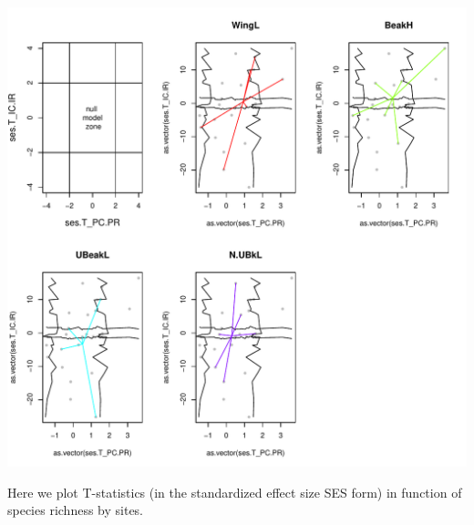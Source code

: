 \documentclass[12pt]{article}\usepackage[]{graphicx}\usepackage[]{color}
\makeatletter
\def\maxwidth{ %
  \ifdim\Gin@nat@width>\linewidth
    \linewidth
  \else
    \Gin@nat@width
  \fi
}
\newenvironment{knitrout}{}{} %
\makeatother
\begin{document}
\begin{knitrout}
\includegraphics[width=\maxwidth]{figure/unnamed-chunk-333} 

\end{knitrout}

Here we plot T-statistics (in the standardized effect size SES form) in function of species richness by sites.
\end{document}
